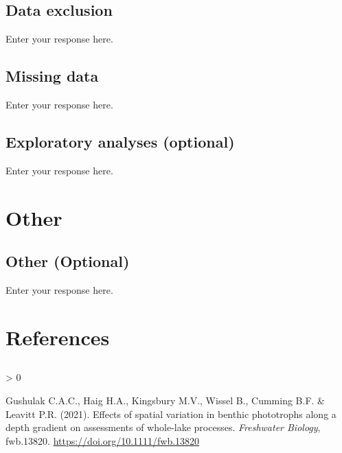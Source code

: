 \documentclass[]{article}
\newlength{\cslhangindent}
\newenvironment{CSLReferences}[2] %
 {%
  \setlength{\parindent}{0pt}
  \ifodd #1 \everypar{\setlength{\hangindent}{\cslhangindent}}\ignorespaces\fi
  \ifnum #2 > 0
  \setlength{\parskip}{#2\baselineskip}
  \fi
 }%
 {}
\begin{document}
\hypertarget{data-exclusion}{%
\subsection{Data exclusion}\label{data-exclusion}}

Enter your response here.

\hypertarget{missing-data}{%
\subsection{Missing data}\label{missing-data}}

Enter your response here.

\hypertarget{exploratory-analyses-optional}{%
\subsection{Exploratory analyses
(optional)}\label{exploratory-analyses-optional}}

Enter your response here.

\hypertarget{other}{%
\section{Other}\label{other}}

\hypertarget{other-optional}{%
\subsection{Other (Optional)}\label{other-optional}}

Enter your response here.

\hypertarget{references}{%
\section{References}\label{references}}

\hypertarget{section}{%
\subsection{}\label{section}}

\vspace{-2pc}
\setlength{\parindent}{-0.5in}
\setlength{\leftskip}{-1in}
\setlength{\parskip}{8pt}

\noindent

\hypertarget{refs}{}
\begin{CSLReferences}{1}{0}
\leavevmode\hypertarget{ref-gushulak_effects_2021}{}%
Gushulak C.A.C., Haig H.A., Kingsbury M.V., Wissel B., Cumming B.F. \&
Leavitt P.R. (2021). Effects of spatial variation in benthic phototrophs
along a depth gradient on assessments of whole‐lake processes.
\emph{Freshwater Biology}, fwb.13820.
\url{https://doi.org/10.1111/fwb.13820}

\end{CSLReferences}
\end{document}
